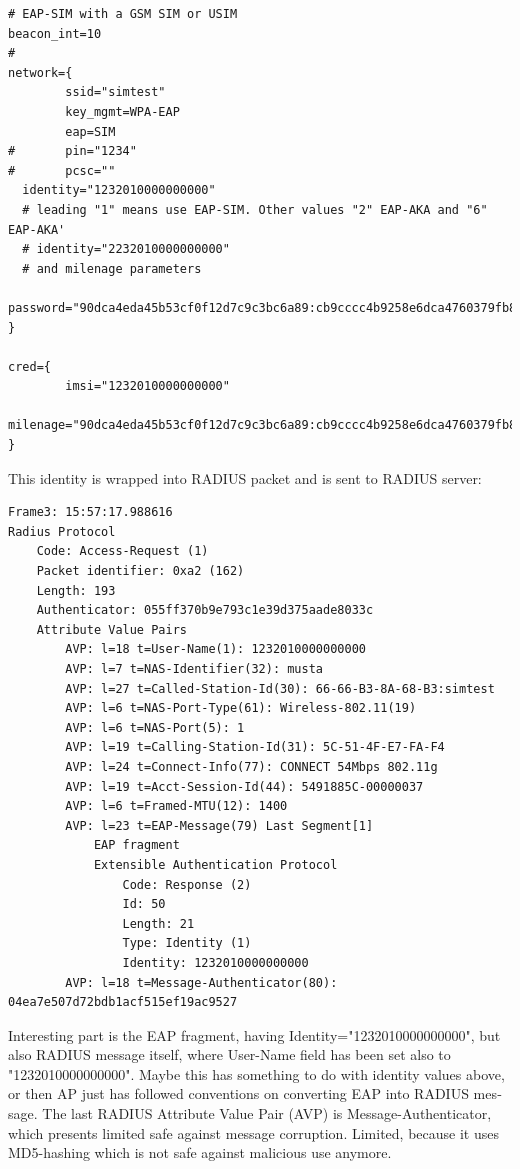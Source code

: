 \documentclass[12pt,a4paper,english]{tutthesis}
\begin{document}
\begin{otherlanguage}{english}
\begin{verbatim}
# EAP-SIM with a GSM SIM or USIM
beacon_int=10
#
network={
        ssid="simtest"
        key_mgmt=WPA-EAP
        eap=SIM
#       pin="1234"
#       pcsc=""
  identity="1232010000000000"
  # leading "1" means use EAP-SIM. Other values "2" EAP-AKA and "6" EAP-AKA'
  # identity="2232010000000000"
  # and milenage parameters
  password="90dca4eda45b53cf0f12d7c9c3bc6a89:cb9cccc4b9258e6dca4760379fb82581"
}

cred={
        imsi="1232010000000000"
        milenage="90dca4eda45b53cf0f12d7c9c3bc6a89:cb9cccc4b9258e6dca4760379fb82581"
}
\end{verbatim}

This identity is wrapped into RADIUS packet and is sent to RADIUS
server:
\begin{verbatim}
Frame3: 15:57:17.988616
Radius Protocol
    Code: Access-Request (1)
    Packet identifier: 0xa2 (162)
    Length: 193
    Authenticator: 055ff370b9e793c1e39d375aade8033c
    Attribute Value Pairs
        AVP: l=18 t=User-Name(1): 1232010000000000
        AVP: l=7 t=NAS-Identifier(32): musta
        AVP: l=27 t=Called-Station-Id(30): 66-66-B3-8A-68-B3:simtest
        AVP: l=6 t=NAS-Port-Type(61): Wireless-802.11(19)
        AVP: l=6 t=NAS-Port(5): 1
        AVP: l=19 t=Calling-Station-Id(31): 5C-51-4F-E7-FA-F4
        AVP: l=24 t=Connect-Info(77): CONNECT 54Mbps 802.11g
        AVP: l=19 t=Acct-Session-Id(44): 5491885C-00000037
        AVP: l=6 t=Framed-MTU(12): 1400
        AVP: l=23 t=EAP-Message(79) Last Segment[1]
            EAP fragment
            Extensible Authentication Protocol
                Code: Response (2)
                Id: 50
                Length: 21
                Type: Identity (1)
                Identity: 1232010000000000
        AVP: l=18 t=Message-Authenticator(80): 04ea7e507d72bdb1acf515ef19ac9527
\end{verbatim}
Interesting part is the EAP fragment, having
Identity="1232010000000000", but
also RADIUS message itself, where User-Name field has been set also 
to "1232010000000000". Maybe this has something to do with identity
values above, or then AP just has followed conventions on converting
EAP into RADIUS message. The last RADIUS Attribute Value Pair (AVP) is 
Message-Authenticator, which presents limited safe against message 
corruption. Limited, because it uses MD5-hashing which is not safe
against malicious use anymore.






\end{otherlanguage}
\end{document}
